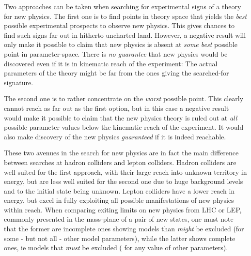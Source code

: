 \newcommand{\mstq}    {\mbox{$ M_{\widetilde {\mathrm t}}                      $}}
\newcommand{\sbq}     {\mbox{$ \widetilde {\mathrm b}                          $}}
\newcommand{\sbqone}  {\mbox{$ \widetilde {\mathrm b}_1                        $}}
\newcommand{\sbqtwo}  {\mbox{$ \widetilde {\mathrm b}_2                        $}}
\newcommand{\msbq}    {\mbox{$ M_{\widetilde {\mathrm b}}                      $}}
\newcommand{\msbqone}    {\mbox{$ M_{\widetilde {\mathrm b}_1}                 $}}
\newcommand{\msbqtwo}    {\mbox{$ M_{\widetilde {\mathrm b}_2}                 $}}
\newcommand{\mstqone}    {\mbox{$ M_{\widetilde {\mathrm t}_1}                 $}}
\newcommand{\mstqtwo}    {\mbox{$ M_{\widetilde {\mathrm t}_2}                 $}}
\newcommand{\eeto}    {\mbox{$ {\, \mathrm e}^+ {\mathrm e}^- \to             $}}
\newcommand{\Ecms}    {\mbox{$ E_{\mathrm{\small cms}}                      $}}

Two approaches can be taken when searching for experimental signs of
a theory for new physics.
The first one is to find points in theory space that yields the
{\it best} possible experimental prospects to observe new physics.
This gives chances to find such signs far out in
hitherto uncharted land.
However,
a negative result will only make it possible to claim that
new physics is absent at {\it some best} possible point
in parameter-space.
There is {\it no guarantee} that new physics would be discovered
even if it is in kinematic reach of the experiment:
The actual parameters of the theory might be far from the
ones giving the searched-for signature.

The second one is to rather concentrate on the {\it worst} possible
point.
This clearly cannot reach as far out as the first option,
but in this case a negative result
would make it possible to claim that the new physics theory is
ruled out at {\it all} possible parameter values below the
kinematic reach of the experiment.
It would also make discovery of the new physics {\it guaranteed}
if it is indeed reachable.

These two avenues in the search for new physics
are in fact the main difference between searches at
hadron colliders and lepton colliders.
Hadron colliders are well suited for the first approach,
with their large reach into unknown territory in
energy,
but are less well suited for the second one due to
huge background levels and to the initial state
being unknown.
Lepton colliders have a lower
reach in energy,
but excel in fully exploiting
all possible manifestations of new physics within
reach. 
When comparing exiting limits  on new physics from LHC or LEP,
commonly presented in the mass-plane
of a pair of new states,
one must note that the former are incomplete ones
showing
models than {\it might} be excluded (for some - but not all -
  other model parameters),
while the latter shows complete ones,
ie models that
{\it must} be excluded ( for any value of other parameters).

